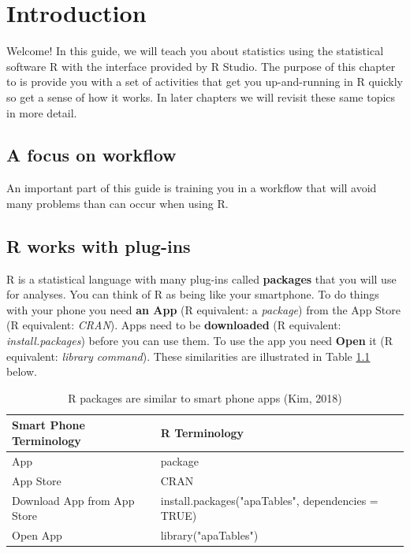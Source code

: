\documentclass[
]{krantz}
\begin{document}
\mainmatter

\hypertarget{introduction}{%
\chapter{Introduction}\label{introduction}}

Welcome! In this guide, we will teach you about statistics using the statistical software R with the interface provided by R Studio. The purpose of this chapter to is provide you with a set of activities that get you up-and-running in R quickly so get a sense of how it works. In later chapters we will revisit these same topics in more detail.

\hypertarget{a-focus-on-workflow}{%
\section{A focus on workflow}\label{a-focus-on-workflow}}

An important part of this guide is training you in a workflow that will avoid many problems than can occur when using R.

\hypertarget{r-works-with-plug-ins}{%
\section{R works with plug-ins}\label{r-works-with-plug-ins}}

R is a statistical language with many plug-ins called \textbf{packages} that you will use for analyses. You can think of R as being like your smartphone. To do things with your phone you need \textbf{an App} (R equivalent: a \emph{package}) from the App Store (R equivalent: \emph{CRAN}). Apps need to be \textbf{downloaded} (R equivalent: \emph{install.packages}) before you can use them. To use the app you need \textbf{Open} it (R equivalent: \emph{library command}). These similarities are illustrated in Table \ref{tab:appstore} below.

\begin{table}

\caption{\label{tab:appstore}R packages are similar to smart phone apps (Kim, 2018)}
\centering
\begin{tabular}[t]{ll}
\toprule
Smart Phone Terminology & R Terminology\\
\midrule
App & package\\
App Store & CRAN\\
Download App from App Store & install.packages("apaTables", dependencies = TRUE)\\
Open App & library("apaTables")\\
\bottomrule
\end{tabular}
\end{table}
\end{document}

